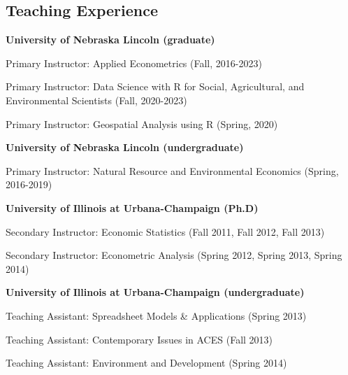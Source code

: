 \documentclass[10pt,margin,line]{res}
\newenvironment{list1}{
  \begin{list}{\ding{113}}{%
      \setlength{\itemsep}{0in}
      \setlength{\parsep}{0in} \setlength{\parskip}{0in}
      \setlength{\topsep}{0in} \setlength{\partopsep}{0in}
      \setlength{\leftmargin}{0.17in}}}{\end{list}}
\newenvironment{list2}{
  \begin{list}{-}{%
      \setlength{\itemsep}{0in}
      \setlength{\parsep}{0in} \setlength{\parskip}{0in}
      \setlength{\topsep}{0in} \setlength{\partopsep}{0in}
      \setlength{\leftmargin}{0.2in}}}{\end{list}}
\begin{document}
\begin{resume}
\section{\sc Teaching Experience}
\begin{list1}
\item[] \textbf{University of Nebraska Lincoln (graduate)}
\vspace*{.05in}
\begin{list2}
\item Primary Instructor: Applied Econometrics (Fall, 2016-2023)
\item Primary Instructor: Data Science with R for Social, Agricultural, and Environmental Scientists (Fall, 2020-2023)
\item Primary Instructor: Geospatial Analysis using R (Spring, 2020)
\end{list2}
\vspace*{.1in}
\item[] \textbf{University of Nebraska Lincoln (undergraduate)}
\vspace*{.05in}
\begin{list2}
\item Primary Instructor: Natural Resource and Environmental Economics (Spring, 2016-2019)
\end{list2}
\vspace*{.1in}
\item[] \textbf{University of Illinois at Urbana-Champaign (Ph.D)}
\vspace*{.05in}
\begin{list2}
\item Secondary Instructor: Economic Statistics (Fall 2011, Fall 2012, Fall 2013)
\item Secondary Instructor: Econometric Analysis (Spring 2012, Spring 2013, Spring 2014)
\end{list2}
\vspace*{.1in}
\item[] \textbf{University of Illinois at Urbana-Champaign (undergraduate)}
\vspace*{.05in}
\begin{list2}
\item Teaching Assistant: Spreadsheet Models \& Applications (Spring 2013)
\item Teaching Assistant: Contemporary Issues in ACES (Fall 2013)
\item Teaching Assistant: Environment and Development (Spring 2014)
\end{list2}
\end{list1}


\end{resume}
\end{document}
